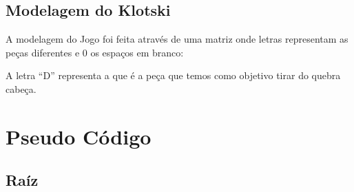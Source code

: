 \documentclass[letterpaper,10pt,openany,oneside,portuges]{sphinxmanual}
\begin{document}
\section{Modelagem do Klotski}
\label{\detokenize{algoritmo:modelagem-do-klotski}}
\begin{DUlineblock}{0em}
\item[] A modelagem do Jogo foi feita através de uma matriz onde letras representam as peças diferentes e 0 os espaços em branco:
\end{DUlineblock}
\begin{figure}[htbp]
\centering

\noindent{}
\end{figure}

\begin{DUlineblock}{0em}
\item[] A letra “D” representa a  que é a peça que temos como objetivo tirar do quebra cabeça.
\end{DUlineblock}


\chapter{Pseudo Código}
\label{\detokenize{pseudo:pseudo-codigo}}\label{\detokenize{pseudo::doc}}

\section{Raíz}
\label{\detokenize{pseudo:raiz}}
\end{document}
